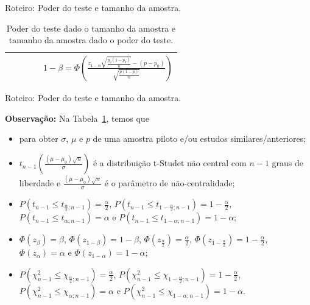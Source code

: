 \documentclass[8pt]{beamer}
\begin{document}
\begin{frame}{Roteiro: Poder do teste e tamanho da amostra.}
\begin{table}[htbp]
{\begin{tabular}{c|c|c|c|c}
		&  &  &  & $1-\beta = \Phi\left( \frac{z_{1-\alpha}\sqrt{\frac{p_0(1-p_0)}{n}} - (p - p_0) }{ \sqrt{\frac{p(1-p)}{n}} } \right)$ \\
		\bottomrule[0.05cm]
	\end{tabular}
}
	\caption{\scriptsize Poder do teste dado o tamanho da amostra e tamanho da amostra dado o poder do teste.}
	\label{tab:power-sample-size}
\end{table}

\normalsize
\end{frame}

\begin{frame}{Roteiro: Poder do teste e tamanho da 
amostra.}

\small

\textbf{Observação:}
Na Tabela~\ref{tab:power-sample-size}, temos que
\begin{itemize}
	\item para obter $\sigma$, $\mu$ e $p$ de uma amostra piloto e/ou estudos similares/anteriores;
	\vfill
	
	\item  $t_{n-1}\left(\frac{(\mu - \mu_0)\sqrt{n}}{\sigma}\right)$ é a distribuição t-Studet não central com $n-1$ graus de liberdade e $\frac{(\mu - \mu_0)\sqrt{n}}{\sigma}$ é o parâmetro de não-centralidade;
	\vfill
	
	\item $P\left(t_{n-1} \leq t_{\frac{\alpha}{2}; n-1}\right) = \frac{\alpha}{2}$, $P\left(t_{n-1} \leq t_{1-\frac{\alpha}{2}; n-1}\right) =1- \frac{\alpha}{2}$, $P\left(t_{n-1} \leq t_{\alpha; n-1}\right) = \alpha$ e $P\left(t_{n-1} \leq t_{1-\alpha; n-1}\right) = 1-\alpha$;
	\vfill
	
	\item $\Phi\left(z_{\beta}\right) = \beta$, $\Phi\left(z_{1-\beta}\right) = 1-\beta$, $\Phi\left(z_{\frac{\alpha}{2}}\right) = \frac{\alpha}{2}$, $\Phi\left(z_{1-\frac{\alpha}{2}}\right) =1- \frac{\alpha}{2}$, $\Phi\left(z_{\alpha}\right) = \alpha$ e $\Phi\left(z_{1-\alpha}\right) =1- \alpha$;
	\vfill
	
	\item $P\left( \chi_{n-1}^2 \leq  \chi_{\frac{\alpha}{2};n-1} \right)=\frac{\alpha}{2}$, $P\left( \chi_{n-1}^2 \leq  \chi_{1-\frac{\alpha}{2};n-1} \right)=1-\frac{\alpha}{2}$, $P\left( \chi_{n-1}^2 \leq  \chi_{\alpha;n-1} \right)=\alpha$ e $P\left( \chi_{n-1}^2 \leq  \chi_{1-\alpha;n-1} \right)=1-\alpha$.
\end{itemize}

\normalsize

\end{frame}
\end{document}
